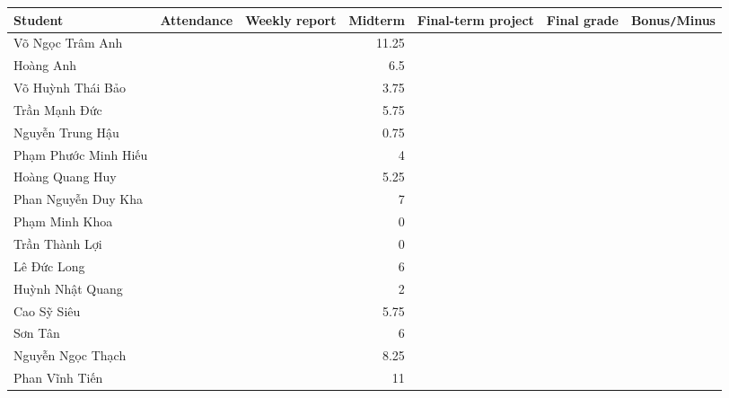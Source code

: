 \documentclass{article}
\begin{document}
\begin{table}[H]
    \centering
    \begin{tabular}{|l|r|r|r|r|r|r|}
        \hline
        Student & Attendance & Weekly report & Midterm & Final-term project & Final grade & Bonus{\tt/}Minus\\
        \hline
        {\sc Võ Ngọc Trâm Anh} &  &  & 11.25 &  &  &  \\
        \hline
        {\sc Hoàng Anh} &  &  & 6.5 &  &  &  \\
        \hline
        {\sc Võ Huỳnh Thái Bảo} &  &  & 3.75 &  &  &  \\
        \hline
        {\sc Trần Mạnh Đức} &  &  & 5.75 &  &  &  \\
        \hline
        {\sc Nguyễn Trung Hậu} &  &  & 0.75 &  &  &  \\
        \hline
        {\sc Phạm Phước Minh Hiếu} &  &  & 4 &  &  &  \\
        \hline
        {\sc Hoàng Quang Huy} &  &  & 5.25 &  &  &  \\
        \hline
        {\sc Phan Nguyễn Duy Kha} &  &  & 7 &  &  &  \\
        \hline
        {\sc Phạm Minh Khoa} &  &  & 0 &  &  &  \\
        \hline
        {\sc Trần Thành Lợi} &  &  & 0 &  &  &  \\
        \hline
        {\sc Lê Đức Long} &  &  & 6 &  &  &  \\
        \hline
        {\sc Huỳnh Nhật Quang} &  &  & 2 &  &  &  \\
        \hline
        {\sc Cao Sỹ Siêu} &  &  & 5.75 &  &  &  \\
        \hline
        {\sc Sơn Tân} &  &  & 6 &  &  &  \\
        \hline
        {\sc Nguyễn Ngọc Thạch} &  &  & 8.25 &  &  &  \\
        \hline
        {\sc Phan Vĩnh Tiến} &  &  & 11 &  &  &  \\
        \hline
    \end{tabular}
\end{table}

\end{document}
